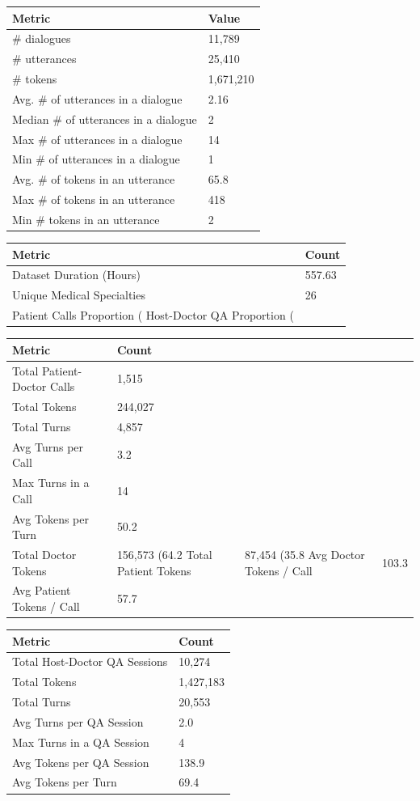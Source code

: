\begin{tabular}{ll}
\toprule
Metric & Value \\
\midrule
# dialogues & 11,789 \\
# utterances & 25,410 \\
# tokens & 1,671,210 \\
Avg. # of utterances in a dialogue & 2.16 \\
Median # of utterances in a dialogue & 2 \\
Max # of utterances in a dialogue & 14 \\
Min # of utterances in a dialogue & 1 \\
Avg. # of tokens in an utterance & 65.8 \\
Max # of tokens in an utterance & 418 \\
Min # tokens in an utterance & 2 \\
\bottomrule
\end{tabular}

\begin{tabular}{ll}
\toprule
Metric & Count \\
\midrule
Dataset Duration (Hours) & 557.63 \\
Unique Medical Specialties & 26 \\
Patient Calls Proportion (%
Host-Doctor QA Proportion (%
\bottomrule
\end{tabular}

\begin{tabular}{ll}
\toprule
Metric & Count \\
\midrule
Total Patient-Doctor Calls & 1,515 \\
Total Tokens & 244,027 \\
Total Turns & 4,857 \\
Avg Turns per Call & 3.2 \\
Max Turns in a Call & 14 \\
Avg Tokens per Turn & 50.2 \\
Total Doctor Tokens & 156,573 (64.2%
Total Patient Tokens & 87,454 (35.8%
Avg Doctor Tokens / Call & 103.3 \\
Avg Patient Tokens / Call & 57.7 \\
\bottomrule
\end{tabular}

\begin{tabular}{ll}
\toprule
Metric & Count \\
\midrule
Total Host-Doctor QA Sessions & 10,274 \\
Total Tokens & 1,427,183 \\
Total Turns & 20,553 \\
Avg Turns per QA Session & 2.0 \\
Max Turns in a QA Session & 4 \\
Avg Tokens per QA Session & 138.9 \\
Avg Tokens per Turn & 69.4 \\
\bottomrule
\end{tabular}
